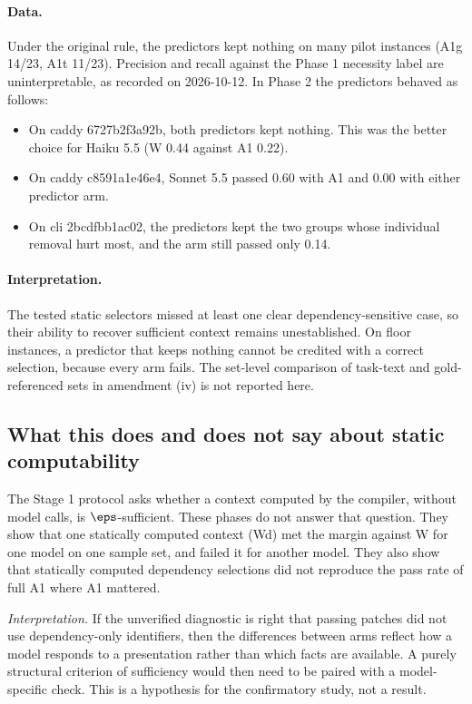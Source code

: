 \paragraph{Data.} Under the original rule, the predictors kept nothing on many pilot instances (A1g 14/23, A1t 11/23). Precision and recall against the Phase 1 necessity label are uninterpretable, as recorded on 2026-10-12. In Phase 2 the predictors behaved as follows:
\begin{itemize}
\item On caddy 6727b2f3a92b, both predictors kept nothing. This was the better choice for Haiku 5.5 (W 0.44 against A1 0.22).
\item On caddy c8591a1e46e4, Sonnet 5.5 passed 0.60 with A1 and 0.00 with either predictor arm.
\item On cli 2bcdfbb1ac02, the predictors kept the two groups whose individual removal hurt most, and the arm still passed only 0.14.
\end{itemize}

\paragraph{Interpretation.} The tested static selectors missed at least one clear dependency-sensitive case, so their ability to recover sufficient context remains unestablished. On floor instances, a predictor that keeps nothing cannot be credited with a correct selection, because every arm fails. The set-level comparison of task-text and gold-referenced sets in amendment (iv) is not reported here.

\subsection{What this does and does not say about static computability}

The Stage 1 protocol asks whether a context computed by the compiler, without model calls, is $\eps$-sufficient. These phases do not answer that question. They show that one statically computed context (Wd) met the margin against W for one model on one sample set, and failed it for another model. They also show that statically computed dependency selections did not reproduce the pass rate of full A1 where A1 mattered.

\emph{Interpretation.} If the unverified diagnostic is right that passing patches did not use dependency-only identifiers, then the differences between arms reflect how a model responds to a presentation rather than which facts are available. A purely structural criterion of sufficiency would then need to be paired with a model-specific check. This is a hypothesis for the confirmatory study, not a result.

